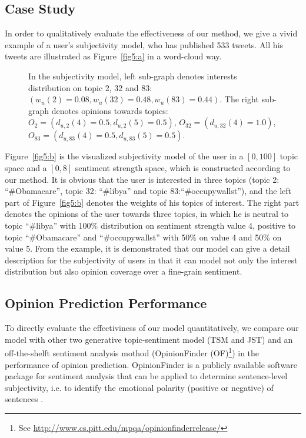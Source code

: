 \begin{landscape}
\subsection{Case Study}

In order to qualitatively evaluate the effectiveness of our method, we give a vivid example of a user's subjectivity model, who has published 533 tweets. All his tweets are illustrated as Figure~\ref{fig5:a} in a word-cloud way.

\begin{figure}[htb]
\centering
{}%
	\caption{ In the subjectivity model, left sub-graph denotes interests distribution on topic 2, 32 and 83: $ (  w_{u}\left( 2 \right)=0.08,w_{u}\left( 32 \right)=0.48, w_{u}\left( 83 \right)=0.44)  $. The right sub-graph denotes opinions towards topics: $ O_{2}=( d_{u,2} \left( 4 \right)=0.5, d_{u,2} \left( 5 \right)=0.5)$, $O_{32}=(d_{u,32} \left( 4 \right)=1.0) $, $ O_{83}=( d_{u,83} \left( 4 \right)=0.5, d_{u,83} \left( 5 \right)=0.5 ) $.}	
	\label{fig5}
\end{figure}

Figure~\ref{fig5:b} is the visualized subjectivity model of the user in a $ [0,100] $ topic space and a $ [0,8] $ sentiment strength space, which is constructed according to our method. 
It is obvious that the user is interested in three topics (topic 2: ``\#Obamacare'', topic 32: ``\#libya'' and topic 83:``\#occupywallst''), and  the left part of Figure~\ref{fig5:b} denotes the weights of his topics of interest. The right part denotes the opinions of the user towards three topics, in which he is neutral to topic ``\#libya'' with 100\% distribution on sentiment strength value 4, positive to topic ``\#Obamacare'' and ``\#occupywallst'' with 50\% on value 4 and 50\% on value 5. 
From the example, it is demonstrated that our model can give a detail description for the subjectivity of users in that it can model not only the interest distribution but also opinion coverage over a fine-grain sentiment.

\subsection{Opinion Prediction Performance}
To directly evaluate the effectiviness of our model quantitatively, we compare our model with other two generative topic-sentiment model (TSM and JST) and an off-the-shelft sentiment analysis mothod (OpinionFinder (OF)\footnote{See \url{http://www.cs.pitt.edu/mpqa/opinionfinderrelease/}}) in the performance of opinion prediction. OpinionFinder is a publicly available software package for sentiment analysis that can be applied to determine sentence-level subjectivity, i.e. to identify the emotional polarity (positive or negative) of sentences \cite{wilson2005recognizing}. 


\end{landscape}
